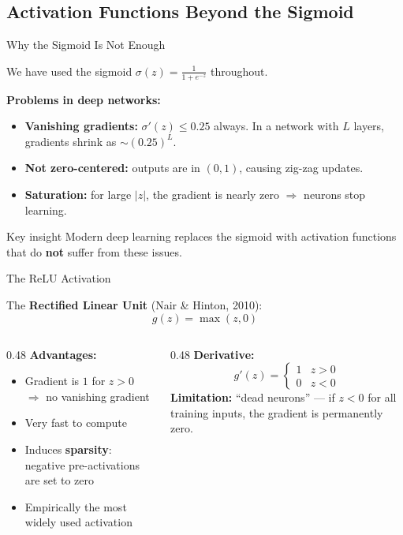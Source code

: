 \documentclass[aspectratio=169]{beamer}
\begin{document}
\subsection{Activation Functions Beyond the Sigmoid}
%
\begin{frame}{Why the Sigmoid Is Not Enough}

We have used the sigmoid $\sigma(z) = \frac{1}{1+e^{-z}}$ throughout.

\medskip
\textbf{Problems in deep networks:}
\begin{itemize}
    \item \textbf{Vanishing gradients:} $\sigma'(z) \leq 0.25$ always. In a network with $L$ layers, gradients shrink as $\sim (0.25)^L$.
    \item \textbf{Not zero-centered:} outputs are in $(0,1)$, causing zig-zag updates.
    \item \textbf{Saturation:} for large $|z|$, the gradient is nearly zero $\Rightarrow$ neurons stop learning.
\end{itemize}

\vspace{0.3cm}
\begin{alertblock}{Key insight}
Modern deep learning replaces the sigmoid with activation functions that do \textbf{not} suffer from these issues.
\end{alertblock}
\end{frame}
%
%
\begin{frame}{The ReLU Activation}

The \textbf{Rectified Linear Unit} (Nair \& Hinton, 2010):
\[
g(z) = \max(z, 0)
\]

\begin{columns}
\begin{column}{0.48\textwidth}
\textbf{Advantages:}
\begin{itemize}
    \item Gradient is $1$ for $z>0$ $\Rightarrow$ no vanishing gradient
    \item Very fast to compute
    \item Induces \textbf{sparsity}: negative pre-activations are set to zero
    \item Empirically the most widely used activation
\end{itemize}
\end{column}
\begin{column}{0.48\textwidth}
\textbf{Derivative:}
\[
g'(z) = \begin{cases} 1 & z > 0 \\ 0 & z < 0 \end{cases}
\]
\textbf{Limitation:} ``dead neurons'' --- if $z < 0$ for all training inputs, the gradient is permanently zero.
\end{column}
\end{columns}

\end{frame}
\end{document}
